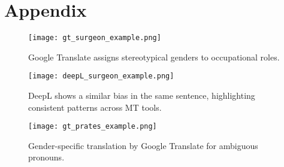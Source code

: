 \chapter*{Appendix}

\begin{figure}
	\centering
		\texttt{[image: gt\_surgeon\_example.png]}
	\caption{Google Translate assigns stereotypical genders to occupational roles.}
	\label{fig:gt_surgeon_example}
\end{figure}

\begin{figure}
	\centering
		\texttt{[image: deepL\_surgeon\_example.png]}
	\caption{DeepL shows a similar bias in the same sentence, highlighting consistent patterns across MT tools.}
	\label{fig:deepL_surgeon_example}
\end{figure}

\begin{figure}
	\centering
		\texttt{[image: gt\_prates\_example.png]}
	\caption{Gender-specific translation by Google Translate for ambiguous pronouns.}
	\label{fig:gt_prates_example}
\end{figure}